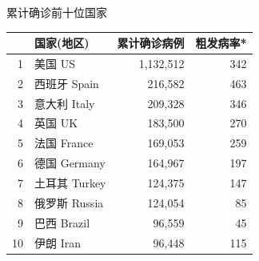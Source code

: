 \documentclass[]{article}
\begin{document}
\begin{table}[H]
    
    \begin{minipage}{.4\linewidth}
    \centering
    \captionsetup{justification=centering}
    \caption{累计确诊前十位国家}
      \vspace{-0.5\baselineskip}
      \centering
      \captionsetup{justification=centering} \begin{table}[H]
\centering\begingroup\fontsize{12}{14}\selectfont

\begin{tabular}{rlrr}
\toprule
  & 国家(地区) & 累计确诊病例 & 粗发病率*\\
\midrule
\rowcolor{gray!6}  1 & 美国 US & 1,132,512 & 342\\
2 & 西班牙 Spain & 216,582 & 463\\
\rowcolor{gray!6}  3 & 意大利 Italy & 209,328 & 346\\
4 & 英国 UK & 183,500 & 270\\
\rowcolor{gray!6}  5 & 法国 France & 169,053 & 259\\
6 & 德国 Germany & 164,967 & 197\\
\rowcolor{gray!6}  7 & 土耳其 Turkey & 124,375 & 147\\
8 & 俄罗斯 Russia & 124,054 & 85\\
\rowcolor{gray!6}  9 & 巴西 Brazil & 96,559 & 45\\
10 & 伊朗 Iran & 96,448 & 115\\
\bottomrule
\end{tabular}
\endgroup{}
\end{table} \end{minipage}
    \begin{minipage}{.7\linewidth}
    \centering
    \captionsetup{justification=centering}
     \caption{粗发病率前十位国家}
     \vspace{-0.5\baselineskip}
      \centering
    \captionsetup{justification=centering} \begin{table}[H]
\centering\begingroup\fontsize{12}{14}\selectfont


\end{table}
\end{minipage}
\end{table}
\end{document}
